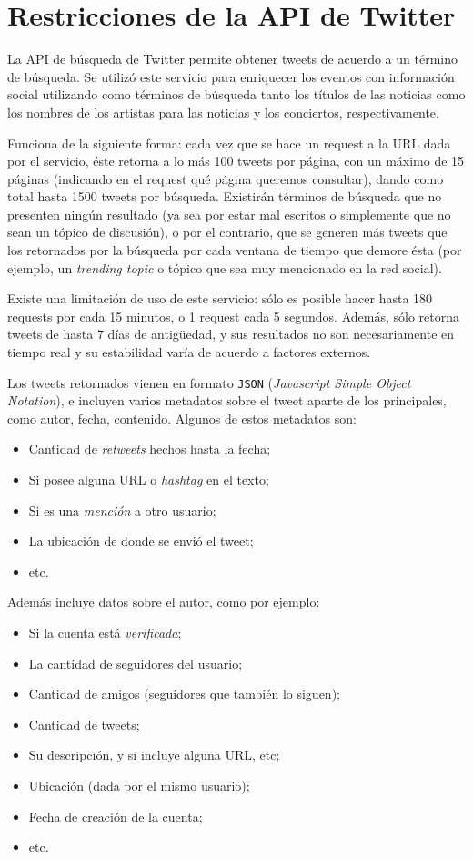 \section{Restricciones de la API de Twitter}
\label{sec-4.5}


   La API de búsqueda de Twitter permite obtener tweets de acuerdo a un
   término de búsqueda. Se utilizó este servicio para enriquecer los
   eventos con información social utilizando como términos de búsqueda
   tanto los títulos de las noticias como los nombres de los artistas
   para las noticias y los conciertos, respectivamente.

   Funciona de la siguiente forma: cada vez que se hace un request a la
   URL dada por el servicio, éste retorna a lo más 100 tweets por página, con un
   máximo de 15 páginas (indicando en el request qué página queremos
   consultar), dando como total hasta 1500 tweets por búsqueda. Existirán
   términos de búsqueda que no presenten ningún resultado  (ya sea por
   estar mal escritos o simplemente que no sean un tópico de discusión), o por
   el contrario, que se generen más tweets que los retornados por la
   búsqueda por cada ventana de tiempo que demore ésta (por ejemplo, un
   \emph{trending topic} o tópico que sea muy mencionado en la red social).

   Existe una limitación de uso de este servicio: sólo es posible hacer
   hasta 180 requests por cada 15 minutos, o 1 request cada 5
   segundos. Además, sólo retorna tweets de hasta 7 días de antigüedad, y
   sus resultados no son necesariamente en tiempo real y su estabilidad
   varía de acuerdo a factores externos.

   Los tweets retornados vienen en formato \texttt{JSON} (\emph{Javascript Simple Object Notation}),
   e incluyen varios metadatos sobre el tweet aparte de los principales,
   como autor, fecha, contenido. Algunos de estos metadatos son:

\begin{itemize}
\item Cantidad de \emph{retweets} hechos hasta la fecha;
\item Si posee alguna URL o \emph{hashtag} en el texto;
\item Si es una \emph{mención} a otro usuario;
\item La ubicación de donde se envió el tweet;
\item etc.
\end{itemize}
  Además incluye datos sobre el autor, como por ejemplo:

\begin{itemize}
\item Si la cuenta está \emph{verificada};
\item La cantidad de seguidores del usuario;
\item Cantidad de amigos (seguidores que también lo siguen);
\item Cantidad de tweets;
\item Su descripción, y si incluye alguna URL, etc;
\item Ubicación (dada por el mismo usuario);
\item Fecha de creación de la cuenta;
\item etc.
\end{itemize}